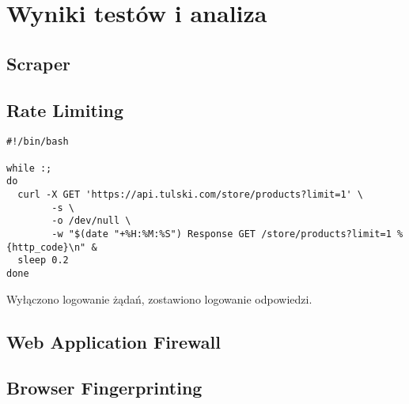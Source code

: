 \newpage

\section{Wyniki testów i analiza}\label{sec:testy}

\subsection{Scraper}

\subsection{Rate Limiting}

\begin{listing}[H]
    \begin{verbatim}
#!/bin/bash

while :;
do
  curl -X GET 'https://api.tulski.com/store/products?limit=1' \
        -s \
        -o /dev/null \
        -w "$(date "+%H:%M:%S") Response GET /store/products?limit=1 %{http_code}\n" &
  sleep 0.2
done
    \end{verbatim}
\end{listing}

Wyłączono logowanie żądań, zostawiono logowanie odpowiedzi.

\subsection{Web Application Firewall}

\subsection{Browser Fingerprinting}
